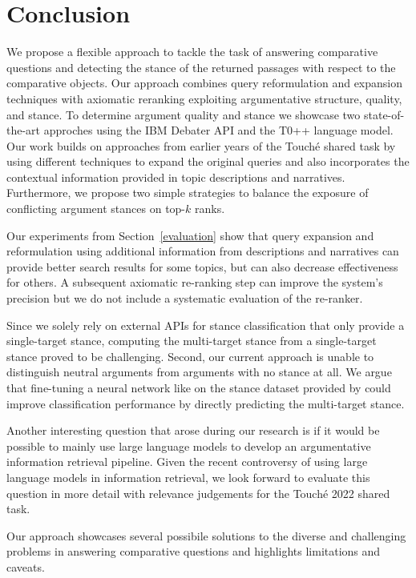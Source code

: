 \section{Conclusion}

We propose a flexible approach to tackle the task of answering comparative questions and detecting the stance of the returned passages with respect to the comparative objects.
Our approach combines query reformulation and expansion techniques with axiomatic reranking exploiting argumentative structure, quality, and stance.
To determine argument quality and stance we showcase two state-of-the-art approches using the IBM Debater API and the T0++ language model.
Our work builds on approaches from earlier years of the Touché shared task by using different techniques to expand the original queries and also incorporates the contextual information provided in topic descriptions and narratives.
Furthermore, we propose two simple strategies to balance the exposure of conflicting argument stances on top-\(k\) ranks.

Our experiments from Section~\ref{evaluation} show that query expansion and reformulation using additional information from descriptions and narratives can provide better search results for some topics, but can also decrease effectiveness for others.
A subsequent axiomatic re-ranking step can improve the system's precision but we do not include a systematic evaluation of the re-ranker.

Since we solely rely on external APIs for stance classification that only provide a single-target stance, computing the multi-target stance from a single-target stance proved to be challenging.
Second, our current approach is unable to distinguish neutral arguments from arguments with no stance at all.
We argue that fine-tuning a neural network like \Bert on the stance dataset provided by \citeauthor{BondarenkoFKSGBPBSWPH2022} could improve classification performance by directly predicting the multi-target stance.

Another interesting question that arose during our research is if it would be possible to mainly use large language models to develop an argumentative information retrieval pipeline.
Given the recent controversy of using large language models in information retrieval, we look forward to evaluate this question in more detail with relevance judgements for the Touché 2022 shared task.

Our approach showcases several possibile solutions to the diverse and challenging problems in answering comparative questions and highlights limitations and caveats.
